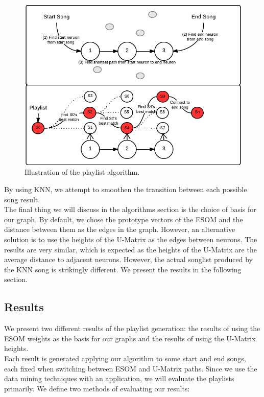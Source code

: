 \begin{figure}[htb!]
	\centering
	\includegraphics[width=\textwidth]{figures/playlist-generation}
	\caption{Illustration of the playlist algorithm.}
\end{figure}

By using KNN, we attempt to smoothen the transition between each possible song result. \\
The final thing we will discuss in the algorithms section is the choice of basis for our graph. By default, we chose 
the prototype vectors of the ESOM and the distance between them as the edges in the graph. However, an alternative solution is to use the heights of the U-Matrix as the edges between neurons. The results are very similar, which is expected as the heights of the U-Matrix are the average distance to adjacent neurons. However, the actual songlist produced by the KNN song is strikingly different. We present the results in the following section.

\subsection{Results}

We present two different results of the playlist generation: the results of using the ESOM weights as the basis for our graphs and the results of using the U-Matrix heights.\\
Each result is generated applying our algorithm to some start and end songs, each fixed when switching between ESOM and U-Matrix paths.
Since we use the data mining techniques with an application, we will evaluate the playlists primarily. We define two methods of evaluating our results:

